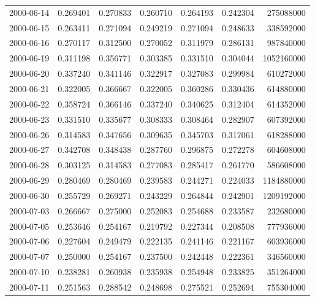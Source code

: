 \begin{tabular}{lrrrrrr}
2000-06-14 &    0.269401 &    0.270833 &    0.260710 &    0.264193 &    0.242304 &   275088000 \\
2000-06-15 &    0.263411 &    0.271094 &    0.249219 &    0.271094 &    0.248633 &   338592000 \\
2000-06-16 &    0.270117 &    0.312500 &    0.270052 &    0.311979 &    0.286131 &   987840000 \\
2000-06-19 &    0.311198 &    0.356771 &    0.303385 &    0.331510 &    0.304044 &  1052160000 \\
2000-06-20 &    0.337240 &    0.341146 &    0.322917 &    0.327083 &    0.299984 &   610272000 \\
2000-06-21 &    0.322005 &    0.366667 &    0.322005 &    0.360286 &    0.330436 &   614880000 \\
2000-06-22 &    0.358724 &    0.366146 &    0.337240 &    0.340625 &    0.312404 &   614352000 \\
2000-06-23 &    0.331510 &    0.335677 &    0.308333 &    0.308464 &    0.282907 &   607392000 \\
2000-06-26 &    0.314583 &    0.347656 &    0.309635 &    0.345703 &    0.317061 &   618288000 \\
2000-06-27 &    0.342708 &    0.348438 &    0.287760 &    0.296875 &    0.272278 &   604608000 \\
2000-06-28 &    0.303125 &    0.314583 &    0.277083 &    0.285417 &    0.261770 &   586608000 \\
2000-06-29 &    0.280469 &    0.280469 &    0.239583 &    0.244271 &    0.224033 &  1184880000 \\
2000-06-30 &    0.255729 &    0.269271 &    0.243229 &    0.264844 &    0.242901 &  1209192000 \\
2000-07-03 &    0.266667 &    0.275000 &    0.252083 &    0.254688 &    0.233587 &   232680000 \\
2000-07-05 &    0.253646 &    0.254167 &    0.219792 &    0.227344 &    0.208508 &   777936000 \\
2000-07-06 &    0.227604 &    0.249479 &    0.222135 &    0.241146 &    0.221167 &   603936000 \\
2000-07-07 &    0.250000 &    0.254167 &    0.237500 &    0.242448 &    0.222361 &   346560000 \\
2000-07-10 &    0.238281 &    0.260938 &    0.235938 &    0.254948 &    0.233825 &   351264000 \\
2000-07-11 &    0.251563 &    0.288542 &    0.248698 &    0.275521 &    0.252694 &   755304000 \\

\end{tabular}
